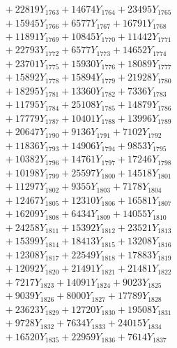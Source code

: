 \documentclass[a4paper,10pt]{article}
\begin{document}
{\begin{align}
&\;  + 22819 Y_{1763} + 14674 Y_{1764} + 23495 Y_{1765} \\[0.3ex]
&\;  + 15945 Y_{1766} + 6577 Y_{1767} + 16791 Y_{1768} \\[0.5ex]\allowbreak
&\;  + 11891 Y_{1769} + 10845 Y_{1770} + 11442 Y_{1771} \\[0.3ex]
&\;  + 22793 Y_{1772} + 6577 Y_{1773} + 14652 Y_{1774} \\[0.3ex]
&\;  + 23701 Y_{1775} + 15930 Y_{1776} + 18089 Y_{1777} \\[0.3ex]
&\;  + 15892 Y_{1778} + 15894 Y_{1779} + 21928 Y_{1780} \\[0.3ex]
&\;  + 18295 Y_{1781} + 13360 Y_{1782} + 7336 Y_{1783} \\[0.3ex]
&\;  + 11795 Y_{1784} + 25108 Y_{1785} + 14879 Y_{1786} \\[0.3ex]
&\;  + 17779 Y_{1787} + 10401 Y_{1788} + 13996 Y_{1789} \\[0.3ex]
&\;  + 20647 Y_{1790} + 9136 Y_{1791} + 7102 Y_{1792} \\[0.3ex]
&\;  + 11836 Y_{1793} + 14906 Y_{1794} + 9853 Y_{1795} \\[0.3ex]
&\;  + 10382 Y_{1796} + 14761 Y_{1797} + 17246 Y_{1798} \\[0.5ex]\allowbreak
&\;  + 10198 Y_{1799} + 25597 Y_{1800} + 14518 Y_{1801} \\[0.3ex]
&\;  + 11297 Y_{1802} + 9355 Y_{1803} + 7178 Y_{1804} \\[0.3ex]
&\;  + 12467 Y_{1805} + 12310 Y_{1806} + 16581 Y_{1807} \\[0.3ex]
&\;  + 16209 Y_{1808} + 6434 Y_{1809} + 14055 Y_{1810} \\[0.3ex]
&\;  + 24258 Y_{1811} + 15392 Y_{1812} + 23521 Y_{1813} \\[0.3ex]
&\;  + 15399 Y_{1814} + 18413 Y_{1815} + 13208 Y_{1816} \\[0.3ex]
&\;  + 12308 Y_{1817} + 22549 Y_{1818} + 17883 Y_{1819} \\[0.3ex]
&\;  + 12092 Y_{1820} + 21491 Y_{1821} + 21481 Y_{1822} \\[0.3ex]
&\;  + 7217 Y_{1823} + 14091 Y_{1824} + 9023 Y_{1825} \\[0.3ex]
&\;  + 9039 Y_{1826} + 8000 Y_{1827} + 17789 Y_{1828} \\[0.5ex]\allowbreak
&\;  + 23623 Y_{1829} + 12720 Y_{1830} + 19508 Y_{1831} \\[0.3ex]
&\;  + 9728 Y_{1832} + 7634 Y_{1833} + 24015 Y_{1834} \\[0.3ex]
&\;  + 16520 Y_{1835} + 22959 Y_{1836} + 7614 Y_{1837} \\[0.3ex]

\end{align}}
\end{document}
